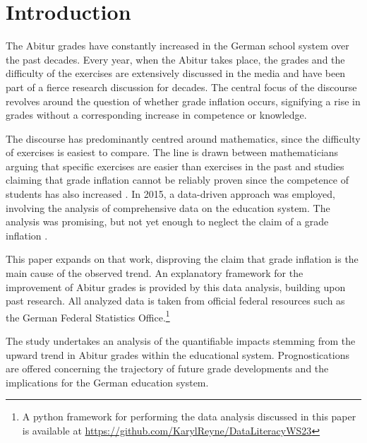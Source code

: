 \section{Introduction}
The Abitur grades have constantly increased in the German school system over the past decades. Every year, when the Abitur takes place, the grades and the difficulty of the exercises are extensively discussed in the media and have been part of a fierce research discussion for decades. The central focus of the discourse revolves around the question of whether grade inflation occurs, signifying a rise in grades without a corresponding increase in competence or knowledge.

The discourse has predominantly centred around mathematics, since the difficulty of exercises is easiest to compare. The line is drawn between mathematicians arguing that specific exercises are easier than exercises in the past \cite{kuhnel2015modellierungskompetenz} \cite{JahnkeKleinKühnelSonarSpindler+2014+115+122} \cite{lemmermeyer2019zentralabitur} and studies claiming that grade inflation cannot be reliably proven since the competence of students has also increased \cite{Schleithoff+2015+3+26}.
In 2015, a data-driven approach was employed, involving the analysis of comprehensive data on the education system. The analysis was promising, but not yet enough to neglect the claim of a grade inflation \cite{doi:10.7788/bue-2015-0407}.

This paper expands on that work, disproving the claim that grade inflation is the main cause of the observed trend. An explanatory framework for the improvement of Abitur grades is provided by this data analysis, building upon past research. All analyzed data is taken from official federal resources such as the German Federal Statistics Office.\footnote{A python framework for performing the data analysis discussed in this paper is available at \url{https://github.com/KarylReyne/DataLiteracyWS23}}

The study undertakes an analysis of the quantifiable impacts stemming from the upward trend in Abitur grades within the educational system. Prognostications are offered concerning the trajectory of future grade developments and the implications for the German education system.
